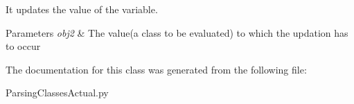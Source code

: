 It updates the value of the variable. 


\begin{DoxyParams}{Parameters}
{\em obj2} & The value(a class to be evaluated) to which the updation has to occur \\
\hline
\end{DoxyParams}


The documentation for this class was generated from the following file\+:\begin{DoxyCompactItemize}
\item 
Parsing\+Classes\+Actual.\+py\end{DoxyCompactItemize}
